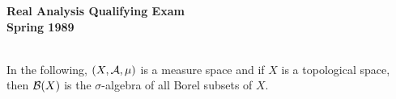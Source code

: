 \documentclass{article}
\begin{document}






\begin{center}\begin{LARGE}
{\bf Real Analysis Qualifying Exam}\\ 
{\bf Spring 1989}\\ \end{LARGE}
\end{center}
\vspace{0.1in}
\noindent\hrulefill\\

In the following, $(X, {\cal A}, \mu)$ is a measure space and if $X$ is
a topological space, then ${\cal B}(X)$ is the $\sigma$-algebra of all
Borel subsets of $X$.
\end{document}
